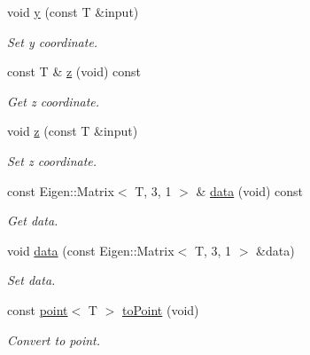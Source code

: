 \begin{DoxyCompactItemize}
void \hyperlink{classddd_1_1row_object_aeb7d81b5fcffd7d8a17fea5b85c37b43}{y} (const T \&input)
\begin{DoxyCompactList}\small\item\em Set y coordinate. \end{DoxyCompactList}\item 
\mbox{\label{classddd_1_1row_object_a8d1d3c3217a0ac951f90e39d980faef4}} 
const T \& \hyperlink{classddd_1_1row_object_a8d1d3c3217a0ac951f90e39d980faef4}{z} (void) const
\begin{DoxyCompactList}\small\item\em Get z coordinate. \end{DoxyCompactList}\item 
void \hyperlink{classddd_1_1row_object_a42c5766595f9ccb58435d97b8a9e0612}{z} (const T \&input)
\begin{DoxyCompactList}\small\item\em Set z coordinate. \end{DoxyCompactList}\item 
\mbox{\label{classddd_1_1row_object_a30e3d89f19ec4001c9e70d0faaa6c579}} 
const Eigen\+::\+Matrix$<$ T, 3, 1 $>$ \& \hyperlink{classddd_1_1row_object_a30e3d89f19ec4001c9e70d0faaa6c579}{data} (void) const
\begin{DoxyCompactList}\small\item\em Get data. \end{DoxyCompactList}\item 
void \hyperlink{classddd_1_1row_object_ae90cbcdfbe32788d18f051a78f8188a6}{data} (const Eigen\+::\+Matrix$<$ T, 3, 1 $>$ \&data)
\begin{DoxyCompactList}\small\item\em Set data. \end{DoxyCompactList}\item 
\mbox{\label{classddd_1_1row_object_a760b84053c4b923e060dae45a9284856}} 
const \hyperlink{classddd_1_1point}{point}$<$ T $>$ \hyperlink{classddd_1_1row_object_a760b84053c4b923e060dae45a9284856}{to\+Point} (void)
\begin{DoxyCompactList}\small\item\em Convert to point. \end{DoxyCompactList}\item 
\mbox{\label{classddd_1_1row_object_a59fbb28dfc75528f20a0032f6a7bdccd}} 

\end{DoxyCompactItemize}
